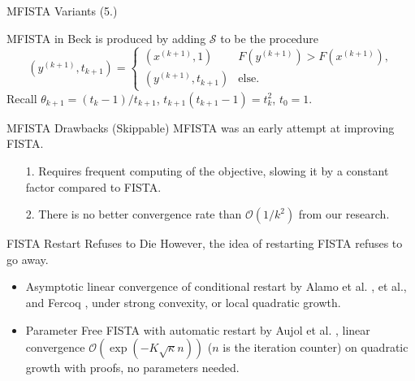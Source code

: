 \documentclass[11pt]{beamer}
\theoremstyle{definition}
\begin{document}
    \begin{frame}{MFISTA Variants (5.)}
        \begin{algorithm}[H]
            \begin{tiny}
                \begin{algorithmic}[1]
                    \ENDFOR
                \end{algorithmic}
                \caption{Generic FISTA}    
            \end{tiny}
        \end{algorithm}
        MFISTA in Beck \cite{beck_fast_2009} is produced by adding $\mathcal S$ to be the procedure
        \[
            (y^{(k + 1)}, t_{k + 1}) = \begin{cases}
                (x^{(k + 1)}, 1) & F(y^{(k + 1)}) > F(x^{(k + 1)}),
                \\
                (y^{(k + 1)}, t_{k + 1}) & \text{else}. 
            \end{cases}
        \]
        Recall 
        $\theta_{k + 1} = (t_k - 1)/t_{k + 1}$, $t_{k + 1}(t_{k + 1} - 1) = t_{k}^2$, $t_0 = 1$. 
    \end{frame}

    \begin{frame}{MFISTA Drawbacks (Skippable)}
        MFISTA was an early attempt at improving FISTA. 
        \begin{itemize}
            \item [1.] Requires frequent computing of the objective, slowing it by a constant factor compared to FISTA. 
            \item [2.] There is no better convergence rate than $\mathcal O(1/k^2)$ from our research. 
        \end{itemize}
    \end{frame}

    \begin{frame}{FISTA Restart Refuses to Die}
        However, the idea of restarting FISTA refuses to go away. 
        \\
        \begin{itemize}
            \item Asymptotic linear convergence of conditional restart by Alamo et al. \cite{alamo_restart_2019},\cite{alamo_gradient_2019} et al., and Fercoq \cite{fercoq_adaptive_2019}, under strong convexity, or local quadratic growth. 
            \item Parameter Free FISTA with automatic restart by Aujol et al. \cite{aujol_parameter-free_2023}, linear convergence $\mathcal O(\exp(-K\sqrt{\kappa}n))$ ($n$ is the iteration counter) on quadratic growth with proofs, no parameters needed.
        \end{itemize}
    \end{frame}
\end{document}

